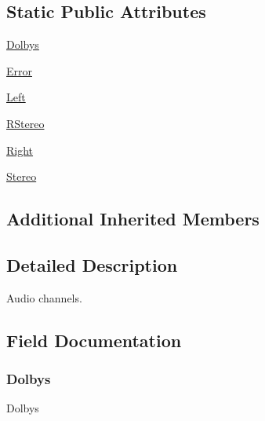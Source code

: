 \subsection*{Static Public Attributes}
\begin{DoxyCompactItemize}
\item 
\hyperlink{classvlc_1_1_audio_output_channel_a1705fcae37d2a0dbe4ab3859d5d080a9}{Dolbys}
\item 
\hyperlink{classvlc_1_1_audio_output_channel_a2c3e4bb40f36b262a5214e2da2bca9c5}{Error}
\item 
\hyperlink{classvlc_1_1_audio_output_channel_aa149c1d1da2ae1c94f1ae91f4919625a}{Left}
\item 
\hyperlink{classvlc_1_1_audio_output_channel_a7c249c9de4146ae067b9819d635fc538}{R\+Stereo}
\item 
\hyperlink{classvlc_1_1_audio_output_channel_a338f1941aaeb45ceefaa84416d2aaddb}{Right}
\item 
\hyperlink{classvlc_1_1_audio_output_channel_a0efd4e24b2435aff80b5a5bac9b6cff1}{Stereo}
\end{DoxyCompactItemize}
\subsection*{Additional Inherited Members}


\subsection{Detailed Description}
\begin{DoxyVerb}Audio channels.
\end{DoxyVerb}
 

\subsection{Field Documentation}
\mbox{\label{classvlc_1_1_audio_output_channel_a1705fcae37d2a0dbe4ab3859d5d080a9}} 
\subsubsection{\texorpdfstring{Dolbys}{Dolbys}}
{\footnotesize\ttfamily Dolbys\hspace{0.3cm}{\ttfamily [static]}}

